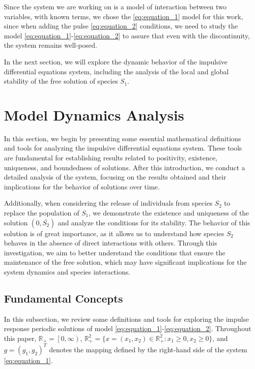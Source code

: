 \documentclass[10pt,letterpaper]{article}
\begin{document}
Since the system we are working on is a model of interaction between two variables, with known terms, we chose the \eqref{eq:equation_1} model for this work, since when adding the pulse \eqref{eq:equation_2} conditions, we need to study the model \eqref{eq:equation_1}-\eqref{eq:equation_2} to assure that even with the discontinuity, the system remains well-posed.

In the next section, we will explore the dynamic behavior of the impulsive differential equations system, including the analysis of the local and global stability of the free solution of species $S_1$.

\section{Model Dynamics Analysis}
\label{sec:dynamics}

In this section, we begin by presenting some essential mathematical definitions and tools for analyzing the impulsive differential equations system. These tools are fundamental for establishing results related to positivity, existence, uniqueness, and boundedness of solutions. After this introduction, we conduct a detailed analysis of the system, focusing on the results obtained and their implications for the behavior of solutions over time. 

Additionally, when considering the release of individuals from species $S_2$ to replace the population of $S_1$, we demonstrate the existence and uniqueness of the solution $(0, \bar{S_2})$ and analyze the conditions for its stability. The behavior of this solution is of great importance, as it allows us to understand how species  $S_2$ behaves in the absence of direct interactions with others. Through this investigation, we aim to better understand the conditions that ensure the maintenance of the free solution, which may have significant implications for the system dynamics and species interactions.

\subsection{Fundamental Concepts}

In this subsection, we review some definitions and tools for exploring the impulse response periodic solutions of model \eqref{eq:equation_1}-\eqref{eq:equation_2}. Throughout this paper, $\mathbb{R}_+ = \left[0, \infty\right)$, $\mathbb{R}^2_+ = \{x = (x_1, x_2) \in \mathbb{R}^2_+: x_1 \geq 0, x_2 \geq 0\}$, and $g = (g_1, g_2)^T$ denotes the mapping defined by the right-hand side of the system \eqref{eq:equation_1}.
\end{document}

